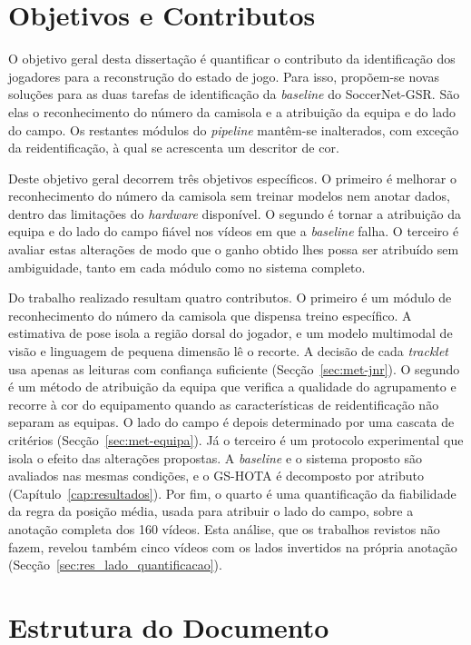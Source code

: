 \section{Objetivos e Contributos}\label{sec:objetivos}

O objetivo geral desta dissertação é quantificar o contributo da identificação dos jogadores para a reconstrução do estado de jogo. Para isso, propõem-se novas soluções para as duas tarefas de identificação da \emph{baseline} do SoccerNet-GSR. São elas o reconhecimento do número da camisola e a atribuição da equipa e do lado do campo. Os restantes módulos do \emph{pipeline} mantêm-se inalterados, com exceção da reidentificação, à qual se acrescenta um descritor de cor.

Deste objetivo geral decorrem três objetivos específicos. O primeiro é melhorar o reconhecimento do número da camisola sem treinar modelos nem anotar dados, dentro das limitações do \emph{hardware} disponível. O segundo é tornar a atribuição da equipa e do lado do campo fiável nos vídeos em que a \emph{baseline} falha. O terceiro é avaliar estas alterações de modo que o ganho obtido lhes possa ser atribuído sem ambiguidade, tanto em cada módulo como no sistema completo.

Do trabalho realizado resultam quatro contributos. O primeiro é um módulo de reconhecimento do número da camisola que dispensa treino específico. A estimativa de pose isola a região dorsal do jogador, e um modelo multimodal de visão e linguagem de pequena dimensão lê o recorte. A decisão de cada \emph{tracklet} usa apenas as leituras com confiança suficiente (Secção~\ref{sec:met-jnr}). O segundo é um método de atribuição da equipa que verifica a qualidade do agrupamento e recorre à cor do equipamento quando as características de reidentificação não separam as equipas. O lado do campo é depois determinado por uma cascata de critérios (Secção~\ref{sec:met-equipa}). Já o terceiro é um protocolo experimental que isola o efeito das alterações propostas. A \emph{baseline} e o sistema proposto são avaliados nas mesmas condições, e o GS-HOTA é decomposto por atributo (Capítulo~\ref{cap:resultados}). Por fim, o quarto é uma quantificação da fiabilidade da regra da posição média, usada para atribuir o lado do campo, sobre a anotação completa dos 160 vídeos. Esta análise, que os trabalhos revistos não fazem, revelou também cinco vídeos com os lados invertidos na própria anotação (Secção~\ref{sec:res_lado_quantificacao}).


\section{Estrutura do Documento}\label{sec:estrutura}


